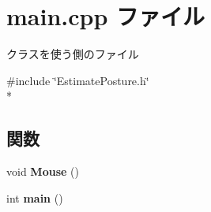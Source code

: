 \section{main.\-cpp ファイル}
\label{main_8cpp}


クラスを使う側のファイル  


{\ttfamily \#include \char`\"{}Estimate\-Posture.\-h\char`\"{}}\\*
\subsection*{関数}
\begin{DoxyCompactItemize}
\item 
void {\bf Mouse} ()
\item 
int {\bf main} ()
\end{DoxyCompactItemize}
